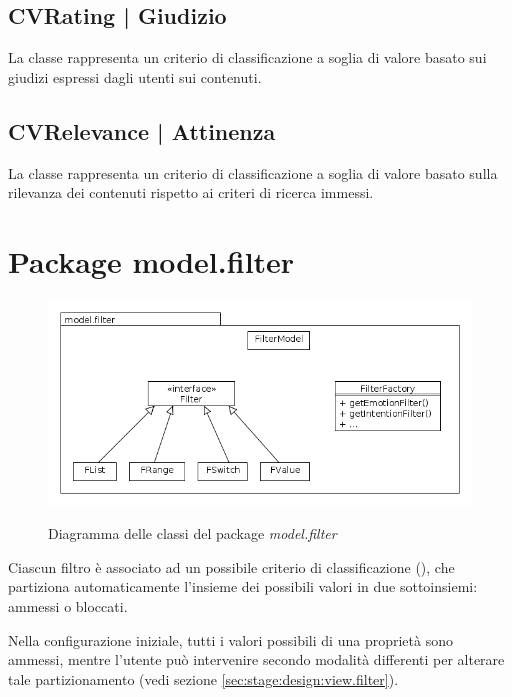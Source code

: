 \documentclass[10pt,a4paper,headinclude,footinclude,hidelinks]{scrreprt} %
\begin{document}
	\subsection[CVRating]{CVRating | Giudizio}
	\label{sec:stage:design:model.criteria:rating}
	La classe \textit{} rappresenta un criterio di classificazione a soglia di valore basato sui giudizi espressi dagli utenti sui contenuti.

	\subsection[CVRelevance]{CVRelevance | Attinenza}
	\label{sec:stage:design:model.criteria:relevance}
	La classe \textit{} rappresenta un criterio di classificazione a soglia di valore basato sulla rilevanza dei contenuti rispetto ai criteri di ricerca immessi.

	\section{Package model.filter}
	\label{sec:stage:design:model.filter}

	\begin{figure}[ht]
		\begin{center}
	    	\includegraphics[width=12cm]{class/model_filter.png}
			\label{gfx:package:model:filter}
			\caption{Diagramma delle classi del package \textit{model.filter}}
		\end{center}
	\end{figure}

	Ciascun filtro è associato ad un possibile criterio di classificazione (\textit{}), che partiziona automaticamente l'insieme dei possibili valori in due sottoinsiemi: ammessi o bloccati.

	Nella configurazione iniziale, tutti i valori possibili di una proprietà sono ammessi, mentre l'utente può intervenire secondo modalità differenti per alterare tale partizionamento (vedi sezione \ref{sec:stage:design:view.filter}).
	
\end{document}
